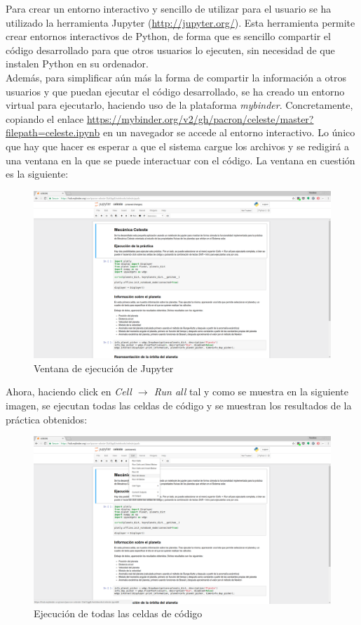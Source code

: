 \documentclass[12pt]{article}
\begin{document}
Para crear un entorno interactivo y sencillo de utilizar para el
usuario se ha utilizado la herramienta Jupyter
(\url{http://jupyter.org/}). Esta herramienta permite crear entornos
interactivos de Python, de forma que es sencillo compartir el código
desarrollado para que otros usuarios lo
ejecuten, sin necesidad de que instalen Python en su ordenador.\\

Además, para simplificar aún más la forma de compartir la información
a otros usuarios y que puedan ejecutar el código desarrollado, se ha
creado un entorno virtual para ejecutarlo, haciendo uso de la
plataforma \textit{mybinder}.  Concretamente, copiando el enlace
\url{https://mybinder.org/v2/gh/pacron/celeste/master?filepath=celeste.ipynb}
en un navegador se accede al entorno interactivo. Lo único que hay que
hacer es esperar a que el sistema cargue los archivos y se redigirá 
a una ventana en la que se puede interactuar con el código. La ventana
en cuestión es la siguiente:

\begin{figure}[H]
  \centering
  \includegraphics[width=.9\textwidth]{imgs/notebook}
  \caption{Ventana de ejecución de Jupyter}
\end{figure}

Ahora, haciendo click en \textit{Cell $\rightarrow$ Run all} tal y como
se muestra en la siguiente imagen, se ejecutan todas las celdas de código
y se muestran los resultados de la práctica obtenidos:

\begin{figure}[H]
  \centering
  \includegraphics[width=.9\textwidth]{imgs/run_all}
  \caption{Ejecución de todas las celdas de código}
\end{figure}
\end{document}
